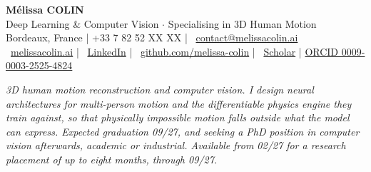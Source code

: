 \documentclass[10pt, letterpaper]{article}
\providecommand{\myphone}{+33 7 82 52 XX XX}
\begin{document}
\begin{center}
    {\fontsize{21}{21}\selectfont \textbf{Mélissa COLIN}} \\[4pt]

    {\large Deep Learning \& Computer Vision $\cdot$ Specialising in 3D Human Motion} \\[4pt]

    \small{
    \faMapMarker* Bordeaux, France \quad|\quad
    \faPhone* \myphone{} \quad|\quad
    \faEnvelope~\href{mailto:contact@melissacolin.ai}{contact@melissacolin.ai} \\
    \faGlobe~\href{https://melissacolin.ai}{melissacolin.ai} \quad|\quad
    \faLinkedin~\href{https://www.linkedin.com/in/melissacolin/}{LinkedIn} \quad|\quad
    \faGithub~\href{https://github.com/melissa-colin}{github.com/melissa-colin} \quad|\quad
    \faGraduationCap~\href{https://scholar.google.com/citations?user=7r7iFpsAAAAJ}{Scholar} \quad|\quad
    \href{https://orcid.org/0009-0003-2525-4824}{ORCID 0009-0003-2525-4824}
    }
\end{center}

\vspace{2pt}

{\small \textit{3D human motion reconstruction and computer vision. I design neural
architectures for multi-person motion and the differentiable physics engine they train
against, so that physically impossible motion falls outside what the model can express.
Expected graduation 09/27, and seeking a PhD position in computer vision afterwards,
academic or industrial. Available from 02/27 for a research placement of up to eight months,
through 09/27.}}
\end{document}
